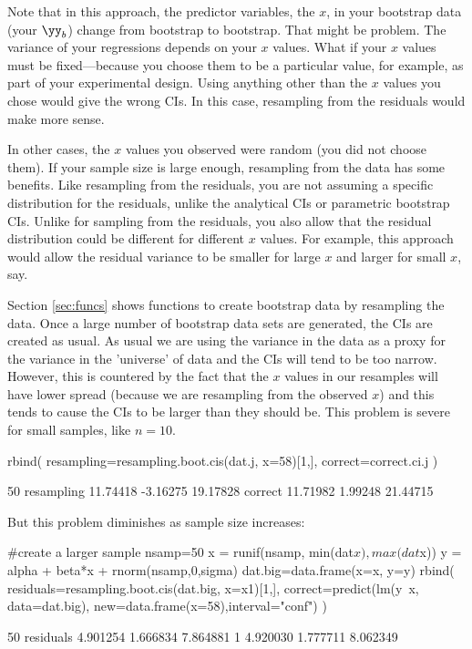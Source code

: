 Note that in this approach, the predictor variables, the $x$, in your bootstrap data (your $\yy_b$) change from bootstrap to bootstrap.  That might be problem. The variance of your regressions depends on your $x$ values.  What if your $x$ values must be fixed---because you choose them to be a particular value, for example, as part of your experimental design.  Using anything other than the $x$ values you chose would give the wrong CIs.  In this case, resampling from the residuals would make more sense.

In other cases, the $x$ values you observed were random (you did not choose them). If your sample size is large enough, resampling from the data has some benefits.  Like resampling from the residuals, you are not assuming a specific distribution for the residuals, unlike the analytical CIs or parametric bootstrap CIs.  Unlike for sampling from the residuals, you also allow that the residual distribution could be different for different $x$ values.  For example, this approach would allow the residual variance to be smaller for large $x$ and larger for small $x$, say.  

Section \ref{sec:funcs} shows functions to create bootstrap data by resampling the data.  Once a large number of bootstrap data sets are generated, the CIs are created as usual.
As usual we are using the variance in the data as a proxy for the variance in the 'universe' of data and the CIs will tend to be too narrow.  However, this is countered by the fact that the $x$ values in our resamples will have lower spread (because we are resampling from the observed $x$) and this tends to cause the CIs to be larger than they should be.  This problem is severe for small samples, like $n=10$.
\begin{Schunk}
\begin{Sinput}
 rbind(
   resampling=resampling.boot.cis(dat.j, x=58)[1,],
   correct=correct.ci.j
 )
\end{Sinput}
\begin{Soutput}
                50%     2.5%    97.5%
resampling 11.74418 -3.16275 19.17828
correct    11.71982  1.99248 21.44715
\end{Soutput}
\end{Schunk}
But this problem diminishes as sample size increases:
\begin{Schunk}
\begin{Sinput}
 #create a larger sample
 nsamp=50
 x = runif(nsamp, min(dat$x), max(dat$x))
 y = alpha + beta*x + rnorm(nsamp,0,sigma)
 dat.big=data.frame(x=x, y=y)
 rbind(
   residuals=resampling.boot.cis(dat.big, x=x1)[1,],
   correct=predict(lm(y~x, data=dat.big), new=data.frame(x=58),interval="conf")
 )
\end{Sinput}
\begin{Soutput}
               50%     2.5%    97.5%
residuals 4.901254 1.666834 7.864881
1         4.920030 1.777711 8.062349
\end{Soutput}
\end{Schunk}

